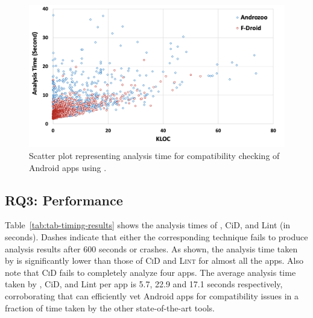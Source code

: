 \begin{figure}[b]
    \centering
    \vspace{-0.5cm}
    \includegraphics[width=0.9\linewidth]{images/scatterplot.png}
    \vspace{-0.4cm}
    \caption{Scatter plot representing analysis time for compatibility checking of Android apps using \@approach.}
    \label{fig:scatterplot}
\end{figure}


\subsection{RQ3: Performance} %

Table~\ref{tab:tab-timing-results} shows the analysis times
of \@approach, {\sc CiD}, and {\sc Lint} (in seconds).
Dashes indicate that either the corresponding technique fails to produce analysis
results after 600 seconds or crashes.
As shown, the analysis time taken by \@approach is
significantly lower than those of \textsc{CiD} and
\textsc{Lint} for almost all the apps. Also note that
\textsc{CiD} fails to completely analyze four apps. %
The average analysis time taken by
\@approach, {\sc CiD}, and {\sc Lint} per app is 5.7, 22.9
and 17.1 seconds respectively, corroborating that \@approach
can efficiently vet Android apps for compatibility issues in
a fraction of time taken by the other state-of-the-art
tools.

